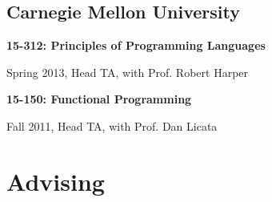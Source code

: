 \documentclass[10pt,letterpaper]{article}
\renewenvironment{itemize}{
  \begin{list}{}{
    \setlength{\leftmargin}{1.25em}
    \setlength{\itemsep}{0.25em}
    \setlength{\parskip}{0pt}
    \setlength{\parsep}{0.2em}
  }
}{
  \end{list}
}
\begin{document}
\subsection*{Carnegie Mellon University}
\begin{itemize}
  \item \textbf{15-312: Principles of Programming Languages}
        \begin{itemize}
          \item Spring 2013, Head TA, with Prof. Robert Harper
        \end{itemize}
  \item \textbf{15-150: Functional Programming}
        \begin{itemize}
          \item Fall 2011, Head TA, with Prof. Dan Licata
        \end{itemize}
\end{itemize}


\section*{Advising}
\end{document}
